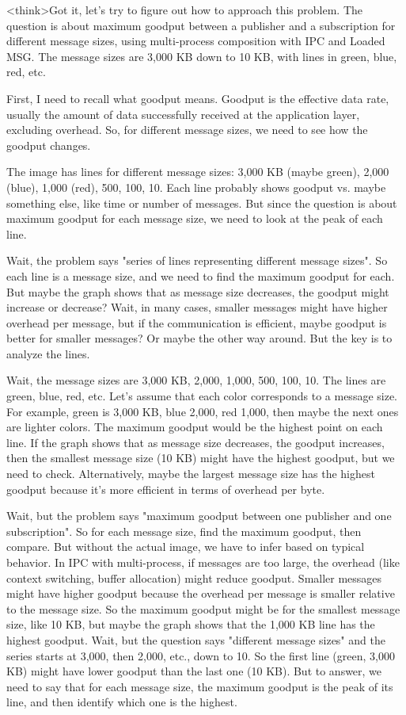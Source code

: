 <think>Got it, let's try to figure out how to approach this problem. The question is about maximum goodput between a publisher and a subscription for different message sizes, using multi-process composition with IPC and Loaded MSG. The message sizes are 3,000 KB down to 10 KB, with lines in green, blue, red, etc. 

First, I need to recall what goodput means. Goodput is the effective data rate, usually the amount of data successfully received at the application layer, excluding overhead. So, for different message sizes, we need to see how the goodput changes. 

The image has lines for different message sizes: 3,000 KB (maybe green), 2,000 (blue), 1,000 (red), 500, 100, 10. Each line probably shows goodput vs. maybe something else, like time or number of messages. But since the question is about maximum goodput for each message size, we need to look at the peak of each line. 

Wait, the problem says "series of lines representing different message sizes". So each line is a message size, and we need to find the maximum goodput for each. But maybe the graph shows that as message size decreases, the goodput might increase or decrease? Wait, in many cases, smaller messages might have higher overhead per message, but if the communication is efficient, maybe goodput is better for smaller messages? Or maybe the other way around. But the key is to analyze the lines. 

Wait, the message sizes are 3,000 KB, 2,000, 1,000, 500, 100, 10. The lines are green, blue, red, etc. Let's assume that each color corresponds to a message size. For example, green is 3,000 KB, blue 2,000, red 1,000, then maybe the next ones are lighter colors. The maximum goodput would be the highest point on each line. If the graph shows that as message size decreases, the goodput increases, then the smallest message size (10 KB) might have the highest goodput, but we need to check. Alternatively, maybe the largest message size has the highest goodput because it's more efficient in terms of overhead per byte. 

Wait, but the problem says "maximum goodput between one publisher and one subscription". So for each message size, find the maximum goodput, then compare. But without the actual image, we have to infer based on typical behavior. In IPC with multi-process, if messages are too large, the overhead (like context switching, buffer allocation) might reduce goodput. Smaller messages might have higher goodput because the overhead per message is smaller relative to the message size. So the maximum goodput might be for the smallest message size, like 10 KB, but maybe the graph shows that the 1,000 KB line has the highest goodput. Wait, but the question says "different message sizes" and the series starts at 3,000, then 2,000, etc., down to 10. So the first line (green, 3,000 KB) might have lower goodput than the last one (10 KB). But to answer, we need to say that for each message size, the maximum goodput is the peak of its line, and then identify which one is the highest. 

